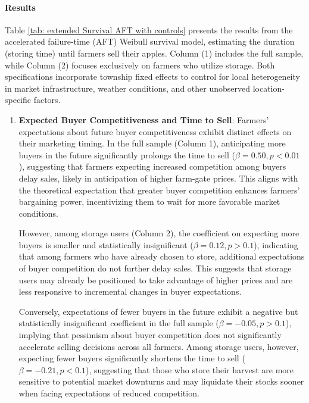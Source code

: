 \documentclass[12pt]{article}
\begin{document}


\paragraph{Results}
Table \ref{tab: extended Survival AFT with controls} presents the results from the accelerated failure-time (AFT) Weibull survival model, estimating the duration (storing time) until farmers sell their apples. Column (1) includes the full sample, while Column (2) focuses exclusively on farmers who utilize storage. Both specifications incorporate township fixed effects to control for local heterogeneity in market infrastructure, weather conditions, and other unobserved location-specific factors.  

\begin{enumerate}
    \item \textbf{Expected Buyer Competitiveness and Time to Sell}: Farmers' expectations about future buyer competitiveness exhibit distinct effects on their marketing timing. In the full sample (Column 1), anticipating more buyers in the future significantly prolongs the time to sell (\(\beta = 0.50, p<0.01\)), suggesting that farmers expecting increased competition among buyers delay sales, likely in anticipation of higher farm-gate prices. This aligns with the theoretical expectation that greater buyer competition enhances farmers' bargaining power, incentivizing them to wait for more favorable market conditions.  
    
    However, among storage users (Column 2), the coefficient on expecting more buyers is smaller and statistically insignificant (\(\beta = 0.12, p>0.1\)), indicating that among farmers who have already chosen to store, additional expectations of buyer competition do not further delay sales. This suggests that storage users may already be positioned to take advantage of higher prices and are less responsive to incremental changes in buyer expectations.  
    
    Conversely, expectations of fewer buyers in the future exhibit a negative but statistically insignificant coefficient in the full sample (\(\beta = -0.05, p>0.1\)), implying that pessimism about buyer competition does not significantly accelerate selling decisions across all farmers. Among storage users, however, expecting fewer buyers significantly shortens the time to sell (\(\beta = -0.21, p<0.1\)), suggesting that those who store their harvest are more sensitive to potential market downturns and may liquidate their stocks sooner when facing expectations of reduced competition.


\end{enumerate}
\end{document}
